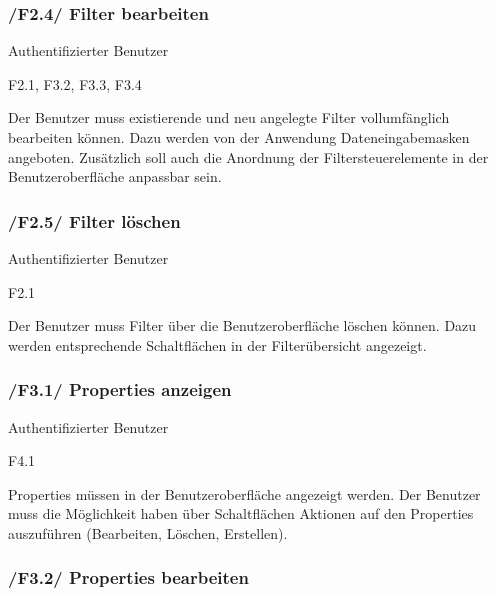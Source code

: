 \subsubsection{/F2.4/ Filter bearbeiten}

\begin{description}[leftmargin=8em,style=nextline]
\item[Akteure] Authentifizierter Benutzer
\item[Includes] F2.1, F3.2, F3.3, F3.4
\item[Beschreibung]
Der Benutzer muss existierende und neu angelegte Filter vollumfänglich bearbeiten können. Dazu werden von der Anwendung Dateneingabemasken angeboten. Zusätzlich soll auch die Anordnung der Filtersteuerelemente in der Benutzeroberfläche anpassbar sein. 
\end{description}

\subsubsection{/F2.5/ Filter löschen}

\begin{description}[leftmargin=8em,style=nextline]
\item[Akteure] Authentifizierter Benutzer
\item[Includes] F2.1
\item[Beschreibung]
Der Benutzer muss Filter über die Benutzeroberfläche löschen können. Dazu werden entsprechende Schaltflächen in der Filterübersicht angezeigt.
\end{description}

\subsubsection{/F3.1/ Properties anzeigen}

\begin{description}[leftmargin=8em,style=nextline]
\item[Akteure] Authentifizierter Benutzer
\item[Includes] F4.1
\item[Beschreibung]
Properties müssen in der Benutzeroberfläche angezeigt werden. Der Benutzer muss die Möglichkeit haben über Schaltflächen Aktionen auf den Properties auszuführen (Bearbeiten, Löschen, Erstellen).
\end{description}

\subsubsection{/F3.2/ Properties bearbeiten}

